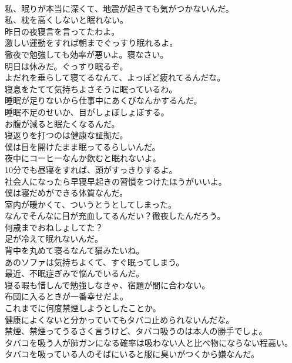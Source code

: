 \documentclass[8pt]{extreport}
\begin{document}
\begin{CJK}{UTF8}{min}
\\	私、眠りが本当に深くて、地震が起きても気がつかないんだ。	
\\	私、枕を高くしないと眠れない。	
\\	昨日の夜寝言を言ってたわよ。	
\\	激しい運動をすれば朝までぐっすり眠れるよ。	
\\	徹夜で勉強しても効率が悪いよ。寝なさい。	
\\	明日は休みだ。ぐっすり眠るぞ。	
\\	よだれを垂らして寝てるなんて、よっぽど疲れてるんだな。	
\\	寝息をたてて気持ちよさそうに眠っているわ。	
\\	睡眠が足りないから仕事中にあくびなんかするんだ。	
\\	睡眠不足のせいか、目がしょぼしょぼする。	
\\	お腹が減ると眠たくなるんだ。	
\\	寝返りを打つのは健康な証拠だ。	
\\	僕は目を開けたまま眠ってるらしいんだ。	
\\	夜中にコーヒーなんか飲むと眠れないよ。	
\\	10分でも昼寝をすれば、頭がすっきりするよ。	
\\	社会人になったら早寝早起きの習慣をつけたほうがいいよ。	
\\	僕は寝だめができる体質なんだ。	
\\	室内が暖かくて、ついうとうとしてしまった。	
\\	なんでそんなに目が充血してるんだい？徹夜したんだろう。	
\\	何歳までおねしょしてた？	
\\	足が冷えて眠れないんだ。	
\\	背中を丸めて寝るなんて猫みたいね。	
\\	あのソファは気持ちよくて、すぐ眠ってしまう。	
\\	最近、不眠症ぎみで悩んでいるんだ。	
\\	寝る暇も惜しんで勉強しなきゃ、宿題が間に合わない。	
\\	布団に入るときが一番幸せだよ。	
\\	これまでに何度禁煙しようとしたことか。	
\\	健康によくないと分かっていてもタバコ止められないんだな。	
\\	禁煙、禁煙ってうるさく言うけど、タバコ吸うのは本人の勝手でしょ。	
\\	タバコを吸う人が肺ガンになる確率は吸わない人と比べ物にならない程高い。	
\\	タバコを吸っている人のそばにいると服に臭いがつくから嫌なんだ。	

\end{CJK}
\end{document}
